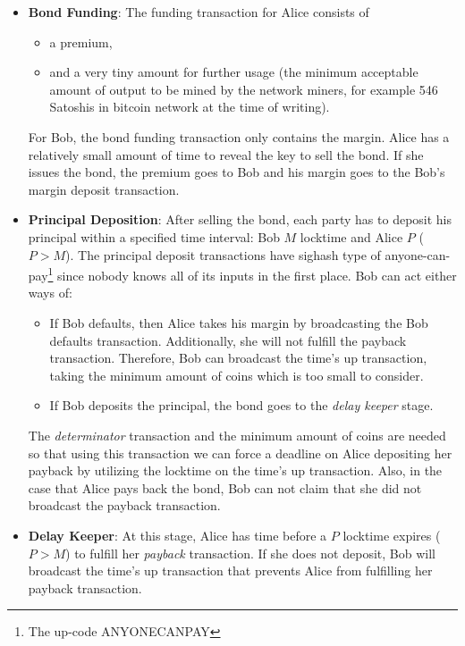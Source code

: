 \begin{itemize}
    \item \textbf{Bond Funding}: 
    The funding transaction for Alice consists of 
    \begin{itemize}
        \item a premium, 
        \item and a very tiny amount for further usage (the minimum acceptable amount of output to be mined by the network miners, for example 546 Satoshis in bitcoin network at the time of writing).
    \end{itemize}
    For Bob, the bond funding transaction only contains the margin. Alice has a relatively small amount of time to reveal the \Aone  key to sell the bond. If she issues the bond, the premium goes to Bob and his margin goes to the Bob's margin deposit transaction.
    
    \item \textbf{Principal Deposition}: 
    After selling the bond, each party has to deposit his principal within a specified time interval: Bob $M$ locktime and Alice $P$ ($P > M$). The principal deposit transactions have sighash type of anyone-can-pay\footnote{The up-code ANYONECANPAY} since nobody knows all of its inputs in the first place. Bob can act either ways of:
    \begin{itemize}
        \item If Bob defaults, then Alice takes his margin by broadcasting the Bob defaults transaction. Additionally, she will not fulfill the payback transaction. Therefore, Bob can broadcast the time's up transaction, taking the minimum amount of coins which is too small to consider.
        \item If Bob deposits the principal, the bond goes to the \emph{delay keeper} stage.
    \end{itemize}
    The \emph{determinator} transaction and the minimum amount of coins are needed so that using this transaction we can force a deadline on Alice depositing her payback by utilizing the locktime on the time's up transaction. Also, in the case that Alice pays back the bond, Bob can not claim that she did not broadcast the payback transaction.
    
    \item \textbf{Delay Keeper}: At this stage, Alice has time before a $P$ locktime expires ($P > M$) to fulfill her \emph{payback} transaction. If she does not deposit, Bob will broadcast the time's up transaction that prevents Alice from fulfilling her payback transaction. 
    

\end{itemize}
